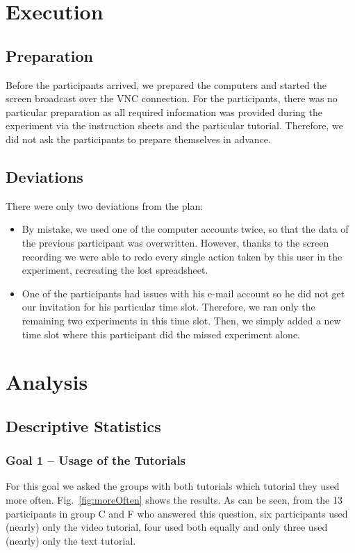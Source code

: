 \section{Execution} 
\subsection{Preparation} 
Before the participants arrived, we prepared the computers and started the screen broadcast over the VNC connection. For the participants, there was no particular preparation as all required information was provided during the experiment via the instruction sheets and the particular tutorial. Therefore, we did not ask the participants to prepare themselves in advance.

\subsection{Deviations} 
\label{sibsec:deviations}
There were only two deviations from the plan:

\begin{itemize}
\item By mistake, we used one of the computer accounts twice, so that the data of the previous participant was overwritten. However, thanks to the screen recording we were able to redo every single action taken by this user in the experiment, recreating the lost spreadsheet.
\item One of the participants had issues with his e-mail account so he did not get our invitation for his particular time slot. Therefore, we ran only the remaining two experiments in this time slot. Then, we simply added a new time slot where this participant did the missed experiment alone.
\end{itemize}




\section{Analysis} 
\subsection{Descriptive Statistics}

\subsubsection{Goal 1 -- Usage of the Tutorials}
For this goal we asked the groups with both tutorials which tutorial they used more often. Fig.~\ref{fig:moreOften} shows the results. As can be seen, from the 13 participants in group C and F who answered this question, six participants used (nearly) only the video tutorial, four used both equally and only three used (nearly) only the text tutorial.



